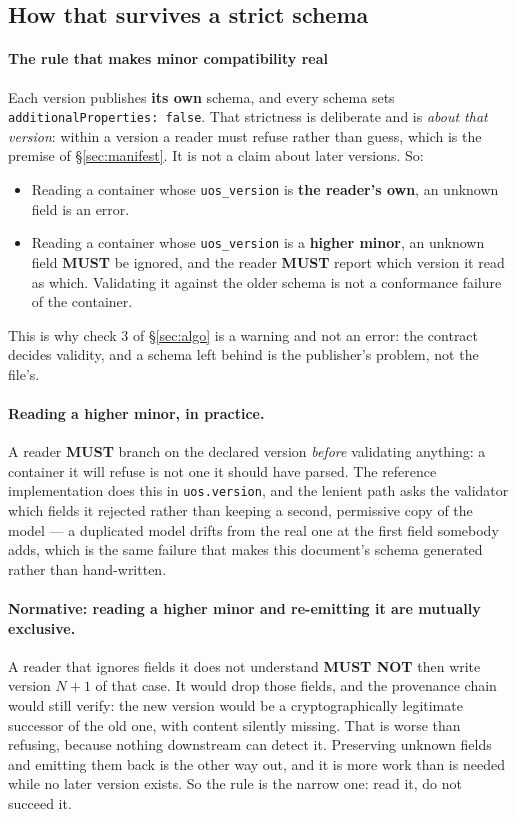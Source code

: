 \documentclass[11pt,a4paper]{article}
\newcommand{\MUST}{\textcolor{uosred}{\textbf{MUST}}}
\newcommand{\MUSTNOT}{\textcolor{uosred}{\textbf{MUST NOT}}}
\newcommand{\code}[1]{\texttt{\small #1}}
\begin{document}
\subsection{How that survives a strict schema}

\paragraph{The rule that makes minor compatibility real}
Each version publishes \textbf{its own} schema, and every schema sets
\code{additionalProperties: false}. That strictness is deliberate and is \emph{about that
version}: within a version a reader must refuse rather than guess, which is the premise of
\S\ref{sec:manifest}. 
\vspace{6px}
It is not a claim about later versions. So:
\begin{itemize}
  \item Reading a container whose \code{uos\_version} is \textbf{the reader's own}, an
  unknown field is an error.
  \item Reading a container whose \code{uos\_version} is a \textbf{higher minor}, an
  unknown field \MUST{} be ignored, and the reader \MUST{} report which version it read as
  which. Validating it against the older schema is not a conformance failure of the
  container.
\end{itemize}
This is why check 3 of \S\ref{sec:algo} is a warning and not an error: the contract decides
validity, and a schema left behind is the publisher's problem, not the file's.

\paragraph{Reading a higher minor, in practice.} A reader \MUST{} branch on the declared
version \emph{before} validating anything: a container it will refuse is not one it should
have parsed. The reference implementation does this in \code{uos.version}, and the lenient
path asks the validator which fields it rejected rather than keeping a second, permissive
copy of the model --- a duplicated model drifts from the real one at the first field
somebody adds, which is the same failure that makes this document's schema generated rather
than hand-written.

\paragraph{Normative: reading a higher minor and re-emitting it are mutually exclusive.}
A reader that ignores fields it does not understand \MUSTNOT{} then write version $N{+}1$
of that case. It would drop those fields, and the provenance chain would still verify: the
new version would be a cryptographically legitimate successor of the old one, with content
silently missing. That is worse than refusing, because nothing downstream can detect it.
Preserving unknown fields and emitting them back is the other way out, and it is more work
than is needed while no later version exists. So the rule is the narrow one: read it, do
not succeed it.
\end{document}
